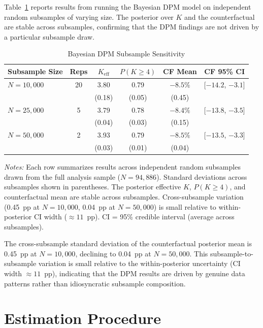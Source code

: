 \documentclass[12pt]{article}
\begin{document}
Table~\ref{tab:dpm_sensitivity} reports results from running the Bayesian DPM model on independent random subsamples of varying size. The posterior over $K$ and the counterfactual are stable across subsamples, confirming that the DPM findings are not driven by a particular subsample draw.

\begin{table}[H]
\centering
\caption{Bayesian DPM Subsample Sensitivity}
\label{tab:dpm_sensitivity}
\begin{threeparttable}
\begin{tabular}{lccccc}
\toprule
Subsample Size & Reps & $K_{\text{eff}}$ & $P(K \geq 4)$ & CF Mean & CF 95\% CI \\
\midrule
$N = 10{,}000$ & 20 & 3.80 & 0.79 & $-8.5\%$ & [$-14.2$, $-3.1$] \\
& & (0.18) & (0.05) & (0.45) & \\
$N = 25{,}000$ & 5 & 3.79 & 0.78 & $-8.4\%$ & [$-13.8$, $-3.5$] \\
& & (0.04) & (0.03) & (0.15) & \\
$N = 50{,}000$ & 2 & 3.93 & 0.79 & $-8.5\%$ & [$-13.5$, $-3.3$] \\
& & (0.03) & (0.01) & (0.04) & \\
\bottomrule
\end{tabular}
\begin{tablenotes}
\small
\item \textit{Notes:} Each row summarizes results across independent random subsamples drawn from the full analysis sample ($N = 94{,}886$). Standard deviations across subsamples shown in parentheses. The posterior effective $K$, $P(K \geq 4)$, and counterfactual mean are stable across subsamples. Cross-subsample variation (0.45~pp at $N = 10{,}000$, 0.04~pp at $N = 50{,}000$) is small relative to within-posterior CI width ($\approx 11$~pp). CI = 95\% credible interval (average across subsamples).
\end{tablenotes}
\end{threeparttable}
\end{table}

The cross-subsample standard deviation of the counterfactual posterior mean is 0.45~pp at $N = 10{,}000$, declining to 0.04~pp at $N = 50{,}000$. This subsample-to-subsample variation is small relative to the within-posterior uncertainty (CI width $\approx 11$~pp), indicating that the DPM results are driven by genuine data patterns rather than idiosyncratic subsample composition.


\section{Estimation Procedure}
\label{app:estimation}
\end{document}
